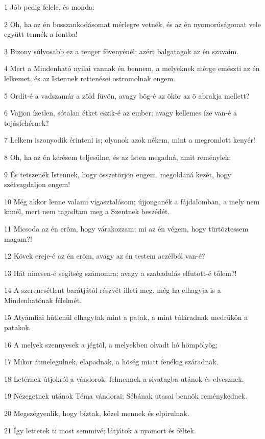 \par 1 Jób pedig felele, és monda:
\par 2 Oh, ha az én bosszankodásomat mérlegre vetnék, és az én nyomorúságomat vele együtt tennék a fontba!
\par 3 Bizony súlyosabb ez a tenger fövenyénél; azért balgatagok az én szavaim.
\par 4 Mert a Mindenható nyilai vannak én bennem, a melyeknek mérge emészti az én lelkemet, és az Istennek rettenései ostromolnak  engem.
\par 5 Ordít-é a vadszamár a zöld füvön, avagy bõg-é az ökör az õ abrakja mellett?
\par 6 Vajjon ízetlen, sótalan étket eszik-é az ember; avagy kellemes íze van-é a tojásfehérnek?
\par 7 Lelkem iszonyodik érinteni is; olyanok azok nékem, mint a megromlott kenyér!
\par 8 Oh, ha az én kérésem teljesülne, és az Isten megadná, amit reménylek;
\par 9 És tetszenék Istennek, hogy összetörjön engem, megoldaná kezét, hogy szétvagdaljon engem!
\par 10 Még akkor lenne valami vigasztalásom; újjonganék a fájdalomban, a mely nem kimél, mert nem tagadtam meg a Szentnek beszédét.
\par 11 Micsoda az én erõm, hogy várakozzam; mi az én végem, hogy türtõztessem magam?!
\par 12 Kövek ereje-é az én erõm, avagy az én testem aczélból van-é?
\par 13 Hát nincsen-é segítség számomra; avagy a szabadulás elfutott-é tõlem?!
\par 14 A szerencsétlent barátjától részvét illeti meg, még ha elhagyja is a Mindenhatónak félelmét.
\par 15 Atyámfiai hûtlenül elhagytak mint a patak, a mint túláradnak medrükön a patakok.
\par 16 A melyek szennyesek a jégtõl, a melyekben olvadt hó hömpölyög;
\par 17 Mikor átmelegülnek, elapadnak, a hõség miatt fenékig száradnak.
\par 18 Letérnek útjokról a vándorok; felmennek a sivatagba utánok és elvesznek.
\par 19 Nézegetnek utánok Téma vándorai; Sébának utasai bennök reménykednek.
\par 20 Megszégyenlik, hogy bíztak, közel mennek és elpirulnak.
\par 21 Így lettetek ti most semmivé; látjátok a nyomort és féltek.
